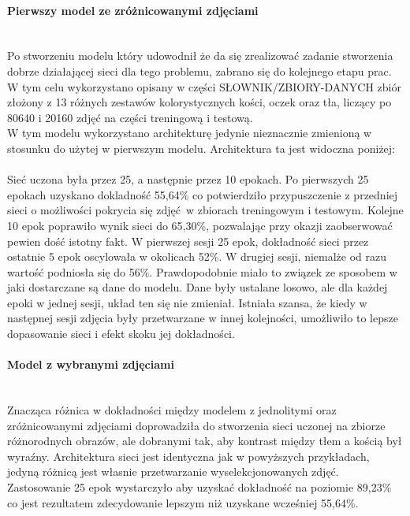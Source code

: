 \paragraph{Pierwszy model ze zróżnicowanymi zdjęciami} \mbox{}\\
Po stworzeniu modelu który udowodnił że da się zrealizować zadanie stworzenia dobrze
działającej sieci dla tego problemu, zabrano się do kolejnego etapu prac. W tym celu
wykorzystano opisany w części SŁOWNIK/ZBIORY-DANYCH zbiór złożony z 13 różnych zestawów
kolorystycznych kości, oczek oraz tła, liczący po 80640 i 20160 zdjęć na części
treningową i testową. \\
W tym modelu wykorzystano architekturę jedynie nieznacznie zmienioną w stosunku do
użytej w pierwszym modelu. Architektura ta jest widoczna poniżej: \\\\
Sieć uczona była przez 25, a następnie przez 10 epokach.
Po pierwszych 25 epokach uzyskano dokladność 55,64\% co potwierdziło przypuszczenie
z przedniej sieci o możliwości pokrycia się zdjęć w zbiorach treningowym i testowym.
Kolejne 10 epok poprawiło wynik sieci do 65,30\%, pozwalając przy okazji zaobserwować
pewien dość istotny fakt. W pierwszej sesji 25 epok, dokładność sieci przez ostatnie
5 epok oscylowała w okolicach 52\%. W drugiej sesji, niemalże od razu wartość
podniosła się do 56\%. Prawdopodobnie miało to związek ze sposobem w jaki dostarczane
są dane do modelu. Dane były ustalane losowo, ale dla każdej epoki w jednej sesji,
układ ten się nie zmieniał. Istniała szansa, że kiedy w następnej sesji zdjęcia
były przetwarzane w innej kolejności, umożliwiło to lepsze dopasowanie sieci i efekt
skoku jej dokładności.

\paragraph{Model z wybranymi zdjęciami} \mbox{}\\
Znacząca różnica w dokładności między modelem z jednolitymi oraz zróżnicowanymi zdjęciami
doprowadziła do stworzenia sieci uczonej na zbiorze różnorodnych obrazów, ale
dobranymi tak, aby kontrast między tłem a kością był wyraźny. Architektura sieci
jest identyczna jak w powyższych przykładach, jedyną różnicą jest własnie przetwarzanie
wyselekcjonowanych zdjęć. \\
Zastosowanie 25 epok wystarczyło aby uzyskać dokładność na poziomie 89,23\% co jest
rezultatem zdecydowanie lepszym niż uzyskane wcześniej 55,64\%.

